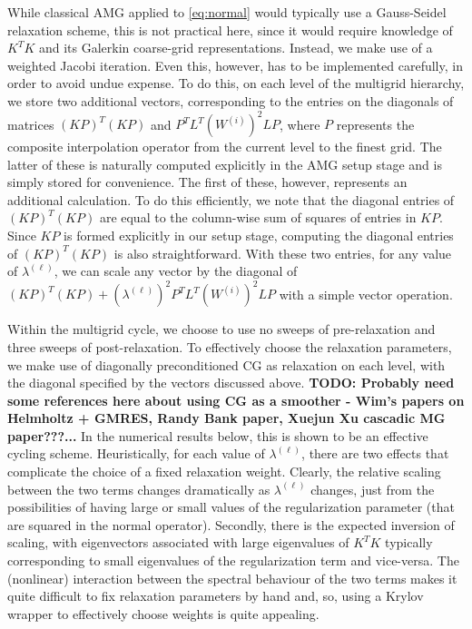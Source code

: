 While classical AMG applied to \eqref{eq:normal} would typically use a
Gauss-Seidel relaxation scheme, this is not practical here, since it
would require knowledge of $K^TK$ and its Galerkin coarse-grid
representations.  Instead, we make use of a weighted Jacobi iteration.
Even this, however, has to be implemented carefully, in order to avoid
undue expense.  To do this, on each level of the multigrid hierarchy,
we store two additional vectors, corresponding to the entries on the
diagonals of matrices $(KP)^T(KP)$ and
$P^TL^T\left(W^{(i)}\right)^2LP$, where $P$ represents the composite
interpolation operator from the current level to the finest grid.  The
latter of these is naturally computed explicitly in the AMG setup
stage and is simply stored for convenience.  The first of these,
however, represents an additional calculation.  To do this
efficiently, we note that the diagonal entries of $(KP)^T(KP)$ are
equal to the column-wise sum of squares of entries in $KP$.  Since
$KP$ is formed explicitly in our setup stage, computing the diagonal
entries of $(KP)^T(KP)$ is also straightforward.  With these two
entries, for any value of $\lambda^{(\ell)}$, we can scale any vector
by the diagonal of $(KP)^T(KP)
+ \left(\lambda^{(\ell)}\right)^2P^TL^T\left(W^{(i)}\right)^2LP$ with
a simple vector operation.

Within the multigrid cycle, we choose to use no sweeps of
pre-relaxation and three sweeps of post-relaxation.  To effectively
choose the relaxation parameters, we make use of diagonally
preconditioned CG as relaxation on each level, with the diagonal
specified by the vectors discussed above.  {\bf TODO: Probably need
some references here about using CG as a smoother - Wim's papers on
Helmholtz + GMRES, Randy Bank paper, Xuejun Xu cascadic MG
paper???...}  In the numerical results below, this is shown to be an
effective cycling scheme.  Heuristically, for each value of
$\lambda^{(\ell)}$, there are two effects that complicate the choice
of a fixed relaxation weight.  Clearly, the relative scaling between
the two terms changes dramatically as $\lambda^{(\ell)}$ changes, just
from the possibilities of having large or small values of the
regularization parameter (that are squared in the normal operator).
Secondly, there is the expected inversion of scaling, with
eigenvectors associated with large eigenvalues of $K^TK$ typically
corresponding to small eigenvalues of the regularization term and
vice-versa.  The (nonlinear) interaction between the spectral
behaviour of the two terms makes it quite difficult to fix relaxation
parameters by hand and, so, using a Krylov wrapper to effectively
choose weights is quite appealing.

